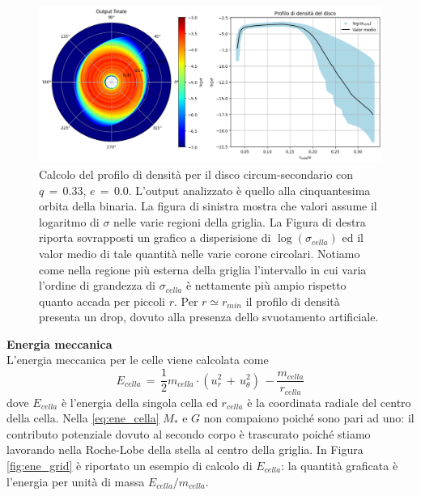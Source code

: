 \begin{figure}[h]
    \centering
    \includegraphics[width=\textwidth]{Immagini/Simulazioni/cal_mass.png}
    \caption{Calcolo del profilo di densità per il disco circum-secondario con $q\,=\,0.33$, $e\,=\,0.0$. L'output analizzato è quello alla cinquantesima orbita della binaria. La figura di sinistra mostra che valori assume il logaritmo di $\sigma$ nelle varie regioni della griglia. La Figura di destra riporta sovrapposti un grafico a disperisione di $\log{(\sigma_{cella})}$ ed il valor medio di tale quantità nelle varie corone circolari. Notiamo come nella regione più esterna della griglia l'intervallo in cui varia l'ordine di grandezza di $\sigma_{cella}$ è nettamente più ampio rispetto quanto accada per piccoli $r$. Per $r \simeq r_{min}$ il profilo di densità presenta un drop, dovuto alla presenza dello svuotamento artificiale.}
    \label{fig:mass_grid}
\end{figure}

\textbf{Energia meccanica}\\

L'energia meccanica per le celle viene calcolata come
\begin{equation}
E_{cella}\,=\,\frac{1}{2}m_{cella} \cdot(u_r^2\,+\,u_\theta^2)\,-\frac{m_{cella}}{r_{cella}}
\label{eq:ene_cella}
\end{equation}
dove $E_{cella}$ è l'energia della singola cella ed $r_{cella}$ è la coordinata radiale del centro della cella.
Nella \eqref{eq:ene_cella} $M_\ast$ e $G$ non compaiono poiché sono pari ad uno: il contributo potenziale dovuto al secondo corpo è trascurato poiché stiamo lavorando nella Roche-Lobe della stella al centro della griglia.
In Figura \ref{fig:ene_grid} è riportato un esempio di calcolo di $E_{cella}$: la quantità graficata è l'energia per unità di massa $E_{cella}/m_{cella}$.\\

